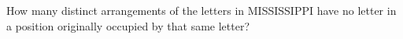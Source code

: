 How many distinct arrangements of the letters in MISSISSIPPI have no letter in a position originally occupied by that same letter?
